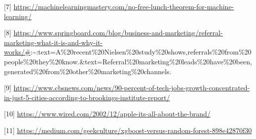 \documentclass[]{tufte-handout}
\begin{document}
{[}7{]}
\url{https://machinelearningmastery.com/no-free-lunch-theorem-for-machine-learning/}

{[}8{]}
\url{https://www.springboard.com/blog/business-and-marketing/referral-marketing-what-it-is-and-why-it-works/\#}:\textasciitilde:text=A\%20recent\%20Nielsen\%20study\%20shows,referrals\%20from\%20people\%20they\%20know.\&text=Referral\%20marketing\%20leads\%20have\%20been,generated\%20from\%20other\%20marketing\%20channels.

{[}9{]}
\url{https://www.cbsnews.com/news/90-percent-of-tech-jobs-growth-concentrated-in-just-5-cities-according-to-brookings-institute-report/}

{[}10{]}
\url{https://www.wired.com/2002/12/apple-its-all-about-the-brand/}

{[}11{]}
\url{https://medium.com/geekculture/xgboost-versus-random-forest-898e42870f30}
\end{document}
